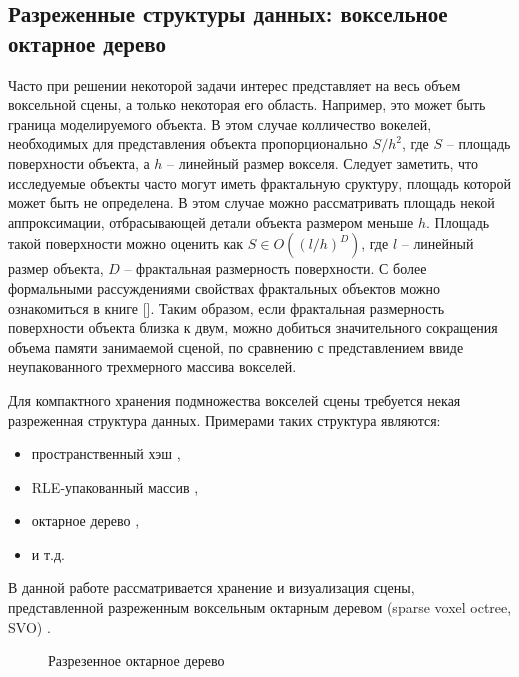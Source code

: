 \subsection{Разреженные структуры данных: воксельное октарное дерево}

Часто при решении некоторой задачи интерес представляет на весь объем воксельной сцены, а только некоторая его область. Например, это может быть граница моделируемого объекта. В этом случае колличество вокелей, необходимых для представления объекта пропорционально $S/h^2$, где $S$ -- площадь поверхности объекта, а $h$ -- линейный размер вокселя. Следует заметить, что исследуемые объекты часто могут иметь фрактальную сруктуру, площадь которой может быть не определена. В этом случае можно рассматривать площадь некой аппроксимации, отбрасывающей детали объекта размером меньше $h$. Площадь такой поверхности можно оценить как $S \in O((l/ h)^D)$, где $l$ -- линейный размер объекта, $D$ -- фрактальная размерность поверхности. С более формальными рассуждениями свойствах фрактальных объектов можно ознакомиться в книге [].
Таким образом, если фрактальная размерность поверхности объекта близка к двум, можно добиться значительного сокращения объема памяти занимаемой сценой, по сравнению с представлением ввиде неупакованного трехмерного массива вокселей.

Для компактного хранения подмножества вокселей сцены требуется некая разреженная структура данных. Примерами таких структура являются:

\begin{itemize}
\item пространственный хэш \cite{gpu_hash},
\item RLE-упакованный массив \cite{voxel_rle},
\item октарное дерево \cite{gpu_octree}, 
\item и т.д.
\end{itemize}

В данной работе рассматривается хранение и визуализация сцены, представленной разреженным воксельным октарным деревом (sparse voxel octree, SVO) \cite{svo_olick}. 

\begin{figure}[h]
  \begin{center}
  \end{center}
  \caption{Разрезенное октарное дерево}
  \label{fig:svo}
\end{figure}

